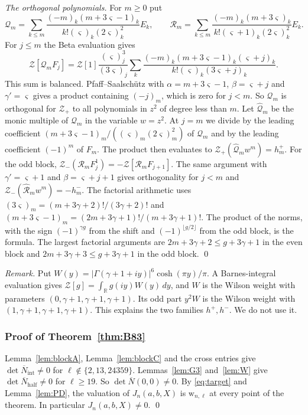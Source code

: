 \documentclass[11pt]{amsart}
\theoremstyle{definition}
\theoremstyle{remark}
\numberwithin{equation}{section}
\newcommand{\R}{\mathbb R}
\begin{document}
\emph{The orthogonal polynomials.} For $m\ge0$ put
\[
 \mathcal Q_m=\sum_{k\le m}\frac{(-m)_k(m+3\varsigma-1)_k}{k!(\varsigma)_k(2\varsigma)_k^2}E_k,\qquad \mathcal R_m=\sum_{k\le m}\frac{(-m)_k(m+3\varsigma)_k}{k!(\varsigma+1)_k(2\varsigma)_k^2}E_k .
\]
For $j\le m$ the Beta evaluation gives
\[
 \mathcal Z[\mathcal Q_mF_j]=\mathcal Z[1]\frac{(\varsigma)_j^3}{(3\varsigma)_j}\sum_{k}\frac{(-m)_k(m+3\varsigma-1)_k(\varsigma+j)_k}{k!(\varsigma)_k(3\varsigma+j)_k}.
\]
This sum is balanced. Pfaff--Saalschütz \cite[Theorem~2.2.6]{AAR99} with $\alpha=m+3\varsigma-1$, $\beta=\varsigma+j$ and $\gamma'=\varsigma$ gives a product containing $(-j)_m$, which is zero for $j<m$. So $\mathcal Q_m$ is orthogonal for $\mathcal Z_+$ to all polynomials in $z^2$ of degree less than $m$. Let $\hat{\mathcal Q}_m$ be the monic multiple of $\mathcal Q_m$ in the variable $w=z^2$. At $j=m$ we divide by the
leading coefficient $(m+3\varsigma-1)_m/((\varsigma)_m(2\varsigma)_m^2)$ of $\mathcal Q_m$ and by the leading
coefficient $(-1)^m$ of $F_m$. The product then evaluates to $\mathcal Z_+(\hat{\mathcal Q}_mw^m)=h^+_m$. For the odd block, $\mathcal Z_-(\mathcal R_mF^1_j)=-\mathcal Z[\mathcal R_mF_{j+1}]$. The same argument with $\gamma'=\varsigma+1$ and $\beta=\varsigma+j+1$ gives orthogonality for $j<m$ and $\mathcal Z_-(\hat{\mathcal R}_mw^m)=-h^-_m$. The factorial arithmetic uses
$(3\varsigma)_m=(m+3\gamma+2)!/(3\gamma+2)!$ and $(m+3\varsigma-1)_m=(2m+3\gamma+1)!/(m+3\gamma+1)!$. The product of the norms, with the sign $(-1)^{\gamma g}$ from the shift and $(-1)^{\lfloor g/2\rfloor}$ from the odd block, is the formula. The largest factorial arguments are
$2m+3\gamma+2\le g+3\gamma+1$ in the even block and $2m+3\gamma+3\le g+3\gamma+1$ in the odd block. \qed

\emph{Remark.} Put $W(y)=|\Gamma(\gamma+1+iy)|^6\cosh(\pi y)/\pi$. A Barnes-integral evaluation gives $\mathcal Z[g]=\int_{\R}g(iy)W(y)\,dy$, and $W$ is the Wilson weight with parameters $(0,\gamma+1,\gamma+1,\gamma+1)$. Its odd part $y^2W$ is the Wilson weight with $(1,\gamma+1,\gamma+1,\gamma+1)$. This explains the two families $h^+,h^-$. We do not use it.

\subsubsection{Proof of Theorem~\ref{thm:B83}}
Lemma~\ref{lem:blockA}, Lemma~\ref{lem:blockC} and the cross entries give $\det\overline N_{\mathrm{int}}\ne0$ for
$\ell\notin\{2,13,24359\}$. Lemmas~\ref{lem:G3} and~\ref{lem:W} give $\det\overline N_{\mathrm{half}}\ne0$ for
$\ell\ge19$. So $\det\overline N(0,0)\ne0$. By \eqref{eq:target} and Lemma~\ref{lem:PD}, the valuation of
$J_n(a,b,X)$ is $\mathrm{w}_{n,\ell}$ at every point of the theorem. In particular $J_n(a,b,X)\ne0$. \qed
\end{document}
